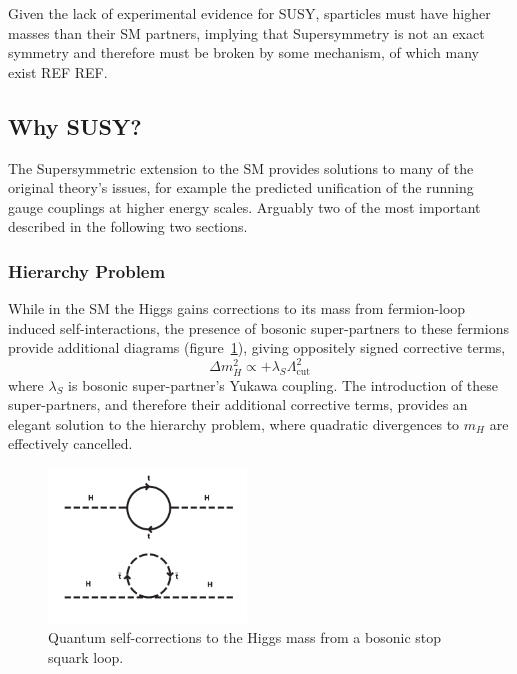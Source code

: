 Given the lack of experimental evidence for SUSY, sparticles must
have higher masses than their SM partners, implying that Supersymmetry is not
an exact symmetry and therefore must be broken by some mechanism, of which many
exist REF REF.



\subsection{Why SUSY?}
The Supersymmetric extension to the SM provides solutions to many of the
original theory's issues, for example the predicted unification of the running
gauge couplings at higher energy scales. Arguably two of the most important
described in the following two sections.

\subsubsection{Hierarchy Problem}
While in the SM the Higgs gains corrections to its mass from fermion-loop
induced self-interactions, the presence of bosonic super-partners to these
fermions provide additional diagrams (figure~\ref{fig:quantum_higgs_sboson_loop}),
giving oppositely signed corrective terms,
% 
\begin{equation}
\Delta m_H^2 \propto + \lambda_S \Lambda_{\text{cut}}^2
\end{equation}
% 
where $\lambda_S$ is bosonic super-partner's Yukawa coupling. The introduction
of these super-partners, and therefore their additional corrective terms,
provides an elegant solution to the hierarchy problem, where quadratic
divergences to $m_H$ are effectively cancelled.

\begin{figure}[ht!]
\centering
\includegraphics[width=0.47\textwidth,trim=0 0 0 250, clip=true]
{Figs/feynman/600px-Hqmc-vector.png}
\caption{Quantum self-corrections to the Higgs mass from a bosonic stop squark
loop.}
\label{fig:quantum_higgs_sboson_loop}
\end{figure}

